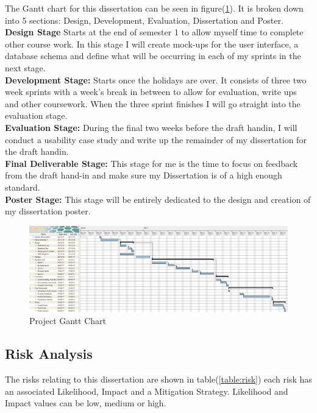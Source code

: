 \documentclass[12pt]{article}  %
\begin{document}
The Gantt chart for this dissertation can be seen in figure(\ref{fig:ganttchart}). It is broken down into 5 sections: Design, Development, Evaluation, Dissertation and Poster.\\
\textbf{Design Stage} Starts at the end of semester 1 to allow myself time to complete other course work. In this stage I will create mock-ups for the user interface, a database schema and define what will be occurring in each of my sprints in the next stage.\\
\textbf{Development Stage:} Starts once the holidays are over. It consists of three two week sprints with  a week's break in between to allow for evaluation, write ups and other coursework. When the three sprint finishes I will go straight into the evaluation stage.\\
\textbf{Evaluation Stage: } During the final two weeks before the draft handin, I will conduct a usability case study and write up the remainder of my dissertation for the draft handin.\\
\textbf{Final Deliverable Stage:} This stage  for me is the time to focus on feedback from the draft hand-in and make sure my Dissertation is of a high enough standard.\\
\textbf{Poster Stage:} This stage will be entirely dedicated to the design and creation of my dissertation poster.

\begin{figure}[!htbp]

\includegraphics[width=\textwidth]{images/ganttchart.png}
\caption{Project Gantt Chart}
\label{fig:ganttchart}

\end{figure}






\subsection{Risk Analysis}
 
The risks relating to this dissertation are shown in table(\ref{table:risk}) each risk has an associated Likelihood, Impact and a Mitigation Strategy. Likelihood and Impact values can be low, medium or high.
\end{document}
